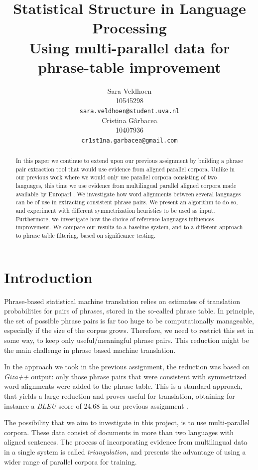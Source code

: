 \documentclass[11pt]{article}
\title{Statistical Structure in Language Processing \\Using multi-parallel data for phrase-table improvement}
\author{ Sara Veldhoen \\
  10545298 \\
  {\small \tt sara.veldhoen@student.uva.nl} 
  \\\And
  Cristina G\^arbacea\\
  10407936 \\
  {\small \tt cr1st1na.garbacea@gmail.com} \\}
\date{}
\begin{document}
\maketitle

\begin{abstract}
In this paper we continue to extend upon our previous assignment by building a phrase pair extraction tool that would use evidence from aligned parallel corpora. Unlike in our previous work where we would only use parallel corpora consisting of two languages, this time we use evidence from multilingual parallel aligned corpora made available by Europarl \cite{EuroparlUrl}. We investigate how word alignments between several languages can be of use in extracting consistent phrase pairs. %
We present an algorithm to do so, and experiment with different symmetrization heuristics to be used as input. Furthermore, we investigate how the choice of reference languages influences improvement. We compare our results to a baseline system, and to a different approach to phrase table filtering, based on significance testing.
\end{abstract}

\section{Introduction}
Phrase-based statistical machine translation relies on estimates of translation probabilities for pairs of phrases, stored in the so-called phrase table.
In principle, the set of possible phrase pairs is far too huge to be computationally manageable, especially if the size of the corpus grows.
Therefore, we need to restrict this set in some way, to keep only useful/meaningful phrase pairs. This reduction might be the main challenge in phrase based machine translation.

In the approach we took in the previous assignment, the reduction was based on \textit{Giza++} output: only those phrase pairs that were consistent with symmetrized word alignments were added to the phrase table. This is a standard approach, that yields a large reduction and proves useful for translation, obtaining for instance a \textit{BLEU} score of 24.68 in our previous assignment \cite{previous}.

The possibility that we aim to investigate in this project, is to use multi-parallel corpora. These data consist of documents in more than two languages with aligned sentences. The process of incorporating evidence from multilingual data in a single system is called \emph{triangulation}, and presents the advantage of using a wider range of parallel corpora for training. 
\end{document}

